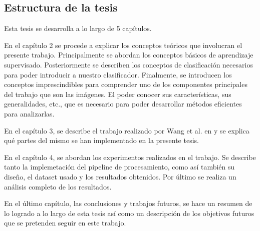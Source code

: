 \subsection{Estructura de la tesis}

	Esta tesis se desarrolla a lo largo de 5 capítulos.	
		
	En el capítulo 2 se procede a explicar los conceptos teóricos que involucran el presente trabajo. Principalmente se abordan los conceptos básicos de aprendizaje supervisado. Posteriormente se describen los conceptos de clasificación necesarios para poder introducir a nuestro clasificador. Finalmente, se introducen los conceptos imprescindibles para comprender uno de los componentes principales del trabajo que son las imágenes. El poder conocer sus características, sus generalidades, etc., que es necesario para poder desarrollar métodos eficientes para analizarlas.
	
	 En el capítulo 3, se describe el trabajo realizado por Wang et al. en \cite{wang} y se explica qué partes del mismo se han implementado en la presente tesis.

	En el capítulo 4, se abordan los experimentos realizados en el trabajo. Se describe tanto la implemetación del pipeline de procesamiento, como así también su diseño, el dataset usado y los resultados obtenidos. Por último se realiza un análisis completo de los resultados.
	
	En el último capítulo, las conclusiones y trabajos futuros, se hace un resumen de lo logrado a lo largo de esta tesis así como un descripción de los objetivos futuros que se pretenden seguir en este trabajo.

